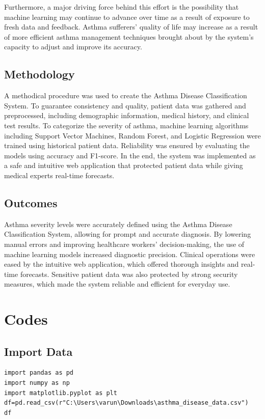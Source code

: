Furthermore, a major driving force behind this effort is the possibility that machine learning may continue to advance over time as a result of exposure to fresh data and feedback. Asthma sufferers' quality of life may increase as a result of more efficient asthma management techniques brought about by the system's capacity to adjust and improve its accuracy.

\subsection{Methodology}
A methodical procedure was used to create the Asthma Disease Classification System. To guarantee consistency and quality, patient data was gathered and preprocessed, including demographic information, medical history, and clinical test results. To categorize the severity of asthma, machine learning algorithms including Support Vector Machines, Random Forest, and Logistic Regression were trained using historical patient data. Reliability was ensured by evaluating the models using accuracy and F1-score. In the end, the system was implemented as a safe and intuitive web application that protected patient data while giving medical experts real-time forecasts.
\subsection{Outcomes}
Asthma severity levels were accurately defined using the Asthma Disease Classification System, allowing for prompt and accurate diagnosis. By lowering manual errors and improving healthcare workers' decision-making, the use of machine learning models increased diagnostic precision. Clinical operations were eased by the intuitive web application, which offered thorough insights and real-time forecasts. Sensitive patient data was also protected by strong security measures, which made the system reliable and efficient for everyday use.

\section{Codes}
\subsection{Import Data}
\begin{verbatim}
import pandas as pd
import numpy as np
import matplotlib.pyplot as plt
df=pd.read_csv(r"C:\Users\varun\Downloads\asthma_disease_data.csv")
df
\end{verbatim}
